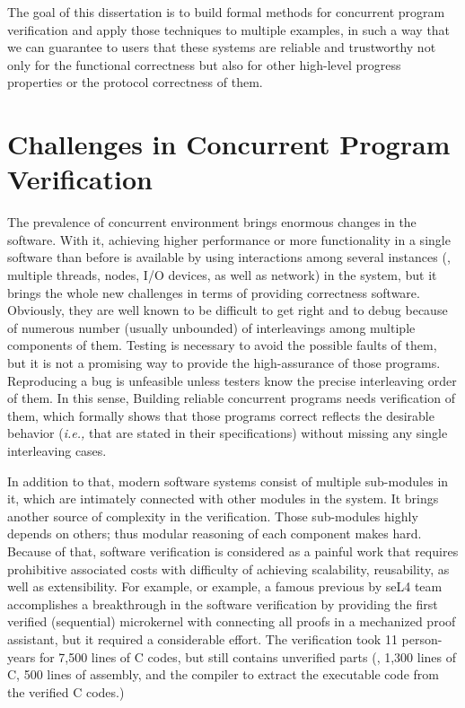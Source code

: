 The goal of this dissertation is to build formal methods for concurrent program verification and apply those techniques to multiple examples,
in such a way that we can guarantee to users that these systems are reliable and trustworthy not only for the functional correctness but also for other high-level progress properties or the protocol correctness of them. 


\section{Challenges in Concurrent Program Verification}
\label{chapter:introduction:sec:challenges-in-concurrent-program-verification}

The prevalence of concurrent environment brings enormous changes in the software. 
With it, achieving higher performance or more functionality in a single software than before is available by
using interactions among several instances (\ie, multiple threads, nodes, I/O devices,
as well as network) in the system,
but it brings the whole new challenges in terms of providing correctness software. 
Obviously, they are well known to be difficult to get right and to debug because of
numerous number (usually unbounded) of interleavings among multiple components of them.
Testing is necessary to avoid the possible faults of them,
but it is not a promising way to provide the high-assurance of those programs. 
Reproducing a bug is unfeasible unless testers know the precise interleaving order of them. 
In this sense, 
Building reliable concurrent programs 
needs verification of them, which formally shows that those programs correct reflects the 
desirable behavior (\textit{i.e.,} that are stated in their specifications) 
without missing any single interleaving cases. 


In addition to that, 
modern software systems consist of multiple sub-modules in it, which are intimately connected with other modules in the system. 
It brings another source of complexity in the verification. 
Those sub-modules highly depends on others;
thus modular reasoning of each component makes hard.
Because of that, 
software verification is considered as a painful work that requires prohibitive associated costs with difficulty of 
achieving scalability, reusability, as well as extensibility.
For example, 
or example, a famous previous by seL4 team~\cite{klein2009sel4} accomplishes
a breakthrough in the software verification 
by providing the first verified (sequential) microkernel with connecting all proofs in  
 a  mechanized proof assistant, 
 but it required a considerable effort. 
The verification took 11 person-years for 7,500 lines of C codes, but still contains unverified parts (\ie, 1,300 lines of C, 500 lines of assembly, and the compiler
to extract the executable code from the verified C codes.)



